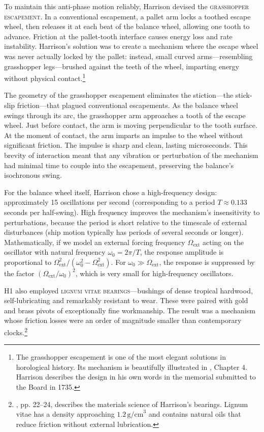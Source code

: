 To maintain this anti-phase motion reliably, Harrison devised the \textsc{grasshopper escapement}. In a conventional escapement, a pallet arm locks a toothed escape wheel, then releases it at each beat of the balance wheel, allowing one tooth to advance. Friction at the pallet-tooth interface causes energy loss and rate instability. Harrison's solution was to create a mechanism where the escape wheel was never actually locked by the pallet: instead, small curved arms—resembling grasshopper legs—brushed against the teeth of the wheel, imparting energy without physical contact.\footnote{The grasshopper escapement is one of the most elegant solutions in horological history. Its mechanism is beautifully illustrated in \textcite{Sobel1995}, Chapter 4. Harrison describes the design in his own words in the memorial submitted to the Board in 1735.}

The geometry of the grasshopper escapement eliminates the stiction—the stick-slip friction—that plagued conventional escapements. As the balance wheel swings through its arc, the grasshopper arm approaches a tooth of the escape wheel. Just before contact, the arm is moving perpendicular to the tooth surface. At the moment of contact, the arm imparts an impulse to the wheel without significant friction. The impulse is sharp and clean, lasting microseconds. This brevity of interaction meant that any vibration or perturbation of the mechanism had minimal time to couple into the escapement, preserving the balance's isochronous swing.

For the balance wheel itself, Harrison chose a high-frequency design: approximately 15 oscillations per second (corresponding to a period $T \approx 0.133$ seconds per half-swing). High frequency improves the mechanism's insensitivity to perturbations, because the period is short relative to the timescale of external disturbances (ship motion typically has periods of several seconds or longer). Mathematically, if we model an external forcing frequency $\Omega_{\text{ext}}$ acting on the oscillator with natural frequency $\omega_0 = 2\pi/T$, the response amplitude is proportional to $\Omega_{\text{ext}}^2 / (\omega_0^2 - \Omega_{\text{ext}}^2)$. For $\omega_0 \gg \Omega_{\text{ext}}$, the response is suppressed by the factor $(\Omega_{\text{ext}}/\omega_0)^2$, which is very small for high-frequency oscillators.

H1 also employed \textsc{lignum vitae bearings}—bushings of dense tropical hardwood, self-lubricating and remarkably resistant to wear. These were paired with gold and brass pivots of exceptionally fine workmanship. The result was a mechanism whose friction losses were an order of magnitude smaller than contemporary clocks.\footnote{\textcite{Betts1978}, pp. 22--24, describes the materials science of Harrison's bearings. Lignum vitae has a density approaching $1.2 \, \text{g/cm}^3$ and contains natural oils that reduce friction without external lubrication.}


